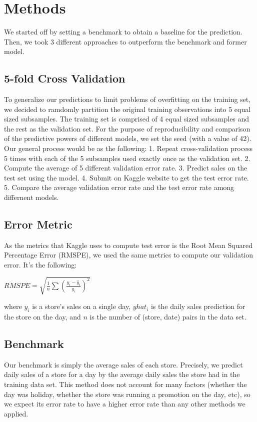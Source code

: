 \documentclass[letterpaper,twocolumn,10pt]{article}
\begin{document}



\section{Methods}
We started off by setting a benchmark to obtain a baseline for the prediction. Then, we took 3 different approaches to outperform the benchmark and former model.  

\subsection{5-fold Cross Validation} %
To generalize our predictions to limit problems of overfitting on the training set, we decided to ramdomly partition the original training observations into 5 equal sized subsamples. The training set is comprised of 4 equal sized subsamples and the rest as the validation set. For the purpose of reproducibility and comparison of the predictive powers of different models, we set the seed (with a value of 42). Our general process would be as the following:
1. Repeat cross-validation process 5 times with each of the 5 subsamples used exactly once as the validation set.
2. Compute the average of 5 different validation error rate. 
3. Predict sales on the test set using the model. 
4. Submit on Kaggle website to get the test error rate.
5. Compare the average validation error rate and the test error rate among differnent models.


\subsection{Error Metric}
As the metrics that Kaggle uses to compute test error is the Root Mean Squared Percentage Error (RMSPE), we used the same metrics to compute our validation error. It's the following:

$RMSPE = \sqrt{\frac{1}{n} \sum {(\frac{y_i - \hat y_i}{y_i})}^2}$

where ${y_i}$ is a store's sales on a single day, ${yhat_i}$ is the daily sales prediction for the store on the day, and ${n}$ is the number of (store, date) pairs in the data set. 

\subsection{Benchmark}
Our benchmark is simply the average sales of each store. Precisely, we predict daily sales of a store for a day by the average daily sales the store had in the training data set. This method does not account for many factors (whether the day was holiday, whether the store was running a promotion on the day, etc), so we expect its error rate to have a higher error rate than any other methods we applied.
\end{document}
